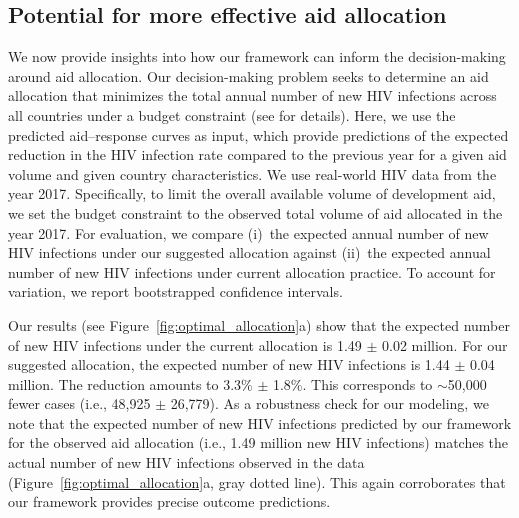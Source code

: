 \documentclass[sigconf]{acmart}
\begin{document}
\subsection{Potential for more effective aid allocation} 

We now provide insights into how our framework can inform the decision-making around aid allocation. 
Our decision-making problem seeks to determine an aid allocation that minimizes the total annual number of new HIV infections across all countries under a budget constraint (see  for details). Here, we use the predicted aid--response curves as input, which provide predictions of the expected reduction in the HIV infection rate compared to the previous year for a given aid volume and given country characteristics. We use real-world HIV data from the year 2017. Specifically, to limit the overall available volume of development aid, we set the budget constraint to the observed total volume of aid allocated in the year 2017. For evaluation, we compare (i)~the expected annual number of new HIV infections under our suggested allocation against (ii)~the expected annual number of new HIV infections under current allocation practice. To account for variation, we report bootstrapped \cite{Efron1992} confidence intervals.

Our results (see Figure~\ref{fig:optimal_allocation}a) show that the expected number of new HIV infections under the current allocation is 1.49 $\pm$ 0.02 million. For our suggested allocation, the expected number of new HIV infections is 1.44 $\pm$ 0.04 million. The reduction amounts to 3.3\% $\pm$ 1.8\%. This corresponds to $\sim$50,000 fewer cases (i.e., 48,925 $\pm$ 26,779). As a robustness check for our modeling, we note that the expected number of new HIV infections predicted by our framework for the observed aid allocation (i.e., 1.49 million new HIV infections) matches the actual number of new HIV infections observed in the data (Figure~\ref{fig:optimal_allocation}a, gray dotted line). This again corroborates that our framework provides precise outcome predictions.
\end{document}
